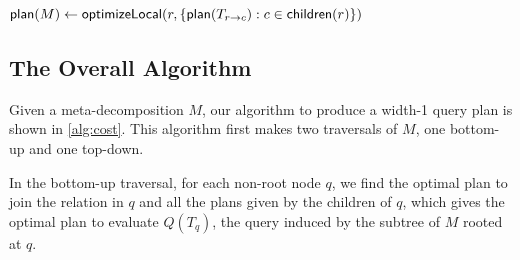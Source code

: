 \begin{algorithm}[t]
\caption{Finding the optimal width-1 query plan to evaluate the query induced by a meta-decomposition}
\label{alg:cost}



${\sf plan}(M) \gets {\sf optimizeLocal}(r, \lbrace {\sf plan}(T_{r \to c}) : c \in \mathsf{children}(r) \rbrace)$ \;





\end{algorithm}

\subsection{The Overall Algorithm}

Given a meta-decomposition $M$, our algorithm to produce a width-1 query plan is shown in \cref{alg:cost}. This algorithm first makes two traversals of $M$, one bottom-up and one top-down.

In the bottom-up traversal, for each non-root node $q$, we find the optimal plan to join the relation in $q$ and all the plans given by the children of $q$, which gives the optimal plan to evaluate $Q(T_q)$, the query induced by the subtree of $M$ rooted at $q$.

